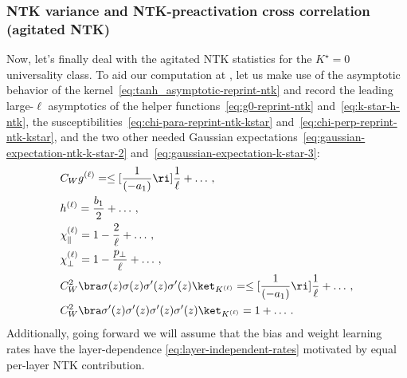 \subsubsection{NTK variance and NTK-preactivation cross correlation (agitated NTK)}
Now, let's finally deal with the agitated NTK statistics for the $K^\star=0$ universality class.
To aid our computation at , let us make use of the asymptotic behavior of the kernel~\eqref{eq:tanh_asymptotic-reprint-ntk} and record the leading large-$\ell$ asymptotics of the helper functions~\eqref{eq:g0-reprint-ntk} and~\eqref{eq:k-star-h-ntk}, the susceptibilities~\eqref{eq:chi-para-reprint-ntk-kstar} and~\eqref{eq:chi-perp-reprint-ntk-kstar}, and the two other needed Gaussian expectations~\eqref{eq:gaussian-expectation-ntk-k-star-2} and~\eqref{eq:gaussian-expectation-k-star-3}:
\begin{align}
&C_W g^{(\ell)}=\le[\frac{1}{(-a_1)}\ri]\frac{1}{\ell}+\ldots\, , \label{eq:ntk-k-star-asymptotic-begin}\\
&h^{(\ell)}=\frac{b_1}{2}+\ldots\, ,\\
&\chi_{\parallel}^{(\ell)}=1- \frac{2}{\ell}+\ldots\, ,\\
&\chi_{\perp}^{(\ell)}=1-\frac{p_{\perp}}{\ell}+\ldots\, ,\label{eq:ntk-k-star-perp-susceptibility-asymptotic}\\
&C_W^2\bra \sigma(z)\sigma(z)\sigma'(z)\sigma'(z) \ket_{K^{(\ell)}}=\le[\frac{1}{(-a_1)}\ri]\frac{1}{\ell}+\ldots\, ,\\
&C_W^2\bra \sigma'(z)\sigma'(z)\sigma'(z)\sigma'(z) \ket_{K^{(\ell)}}=1+\ldots\, .\label{eq:ntk-k-star-asymptotic-end}
\end{align}
Additionally, going forward we will assume that the bias and weight learning rates have the layer-dependence \eqref{eq:layer-independent-rates} motivated by equal per-layer NTK contribution.

